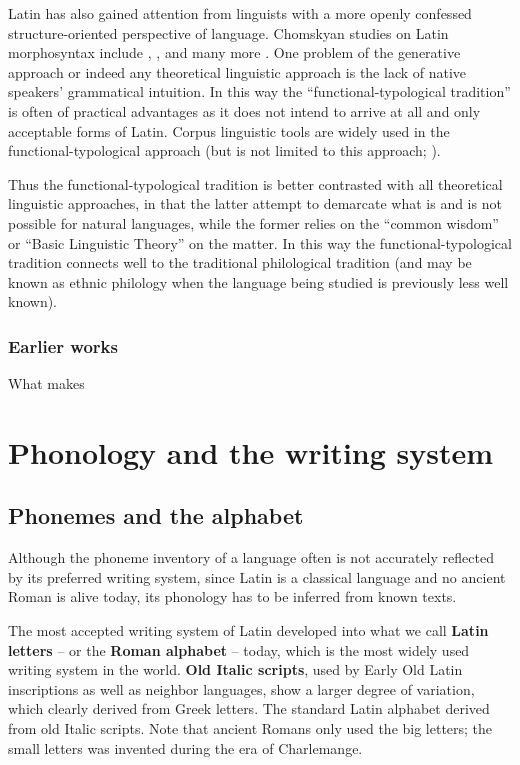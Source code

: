 \documentclass[a4paper, oneside, 12pt]{report}
\newcommand*{\concept}[1]{\textbf{#1}}
\begin{document}
Latin has also gained attention from linguists with a more openly confessed structure-oriented perspective of language.
Chomskyan studies on Latin morphosyntax include \citet{devine2006latin}, \citet{danckaert2015studying}, \citet{danckaert2017development,oniga2014latin} and many more \citep{mateu2017latin}. 
One problem of the generative approach or indeed any theoretical linguistic approach is the lack of native speakers' grammatical intuition.
In this way the ``functional-typological tradition'' is often of practical advantages as it does not intend to arrive at all and only acceptable forms of Latin.
Corpus linguistic tools are widely used in the functional-typological approach
(but is not limited to this approach; \citealt{danckaert2015studying}).

Thus the functional-typological tradition is better contrasted with all theoretical linguistic approaches,
in that the latter attempt to demarcate what is and is not possible for natural languages,
while the former relies on the ``common wisdom'' or ``Basic Linguistic Theory'' \citep{dixon2009basic1} on the matter.
In this way the functional-typological tradition connects well to the traditional philological tradition 
(and may be known as ethnic philology when the language being studied is previously less well known).

\subsection{Earlier works}

What makes 



\chapter{Phonology and the writing system}

\section{Phonemes and the alphabet}

Although the phoneme inventory of a language 
often is not accurately reflected by its preferred writing system, 
since Latin is a classical language 
and no ancient Roman is alive today, 
its phonology has to be inferred from known texts. 

The most accepted writing system of Latin developed into 
what we call \concept{Latin letters} -- or the \concept{Roman alphabet} -- today, 
which is the most widely used writing system in the world.
\concept{Old Italic scripts},
used by Early Old Latin inscriptions 
as well as neighbor languages,
show a larger degree of variation, 
which clearly derived from Greek letters.
The standard Latin alphabet derived from old Italic scripts.
Note that ancient Romans only used the big letters;
the small letters was invented during the era of Charlemange.
\end{document}

